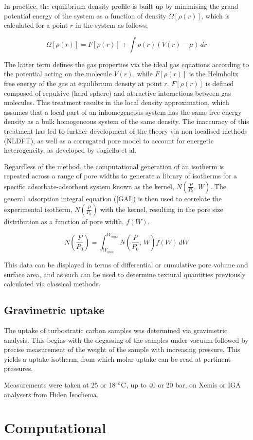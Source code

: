 In practice, the equilibrium density profile is built up by minimising the grand potential energy of the system as a function of density $\Omega[\rho(r)]$, which is calculated for a point $r$ in the system as follows;

\begin{equation}
\Omega[\rho(r)] = F[\rho(r)] + \int \rho(r)\left(V(r) - \mu\right) \,dr
\end{equation}

The latter term defines the gas properties via the ideal gas equations according to the potential acting on the molecule $V(r)$, while $F[\rho(r)]$ is the Helmholtz free energy of the gas at equilibrium density at point $r$. $F[\rho(r)]$ is defined composed of repulsive (hard sphere) and attractive interactions between gas molecules. This treatment results in the local density approximation, which assumes that a local part of an inhomegeneous system has the same free energy density as a bulk homogeneous system of the same density. The inaccuracy of this treatment has led to further development of the theory via non-localised methods (NLDFT),  \citep{tarazona1987phase, lastoskie1993pore, landers2013density} 
as well as a corrugated pore model to account for energetic heterogeneity, as developed by Jagiello et al.\citep{Jagiello20132D}

Regardless of the method, the computational generation of an isotherm is repeated across a range of pore widths to generate a library of isotherms for a specific adsorbate-adsorbent system known as the kernel, $N\left(\frac{P}{P_0}, \, W\right)$. The general adsorption integral equation (\ref{GAI}) is then used to correlate the experimental isotherm, $N\left(\frac{P}{P_0}\right)$  with the kernel, resulting in the pore size distribution as a function of pore width, $f(W)$.\citep{Thommes2015Physisorption}

\begin{equation} \label{eq:GAI}
    N\left(\frac{P}{P_0}\right) = \int_{W_{min}}^{W_{max}} N\left(\frac{P}{P_0}, \, W \right) f(W) \, dW
\end{equation}

This data can be displayed in terms of differential or cumulative pore volume and surface area, and as such can be used to determine textural quantities previously calculated via classical methods.

\subsection{\texorpdfstring{Gravimetric  uptake}{Gravimetric CO2 uptake}}
The  uptake of turbostratic carbon samples was determined via gravimetric analysis. This begins with the degassing of the samples under vacuum followed by precise measurement of the weight of the sample with increasing  pressure. This yields a  uptake isotherm, from which molar uptake can be read at pertinent pressures.

Measurements were taken at 25 or 18 $\rm ^{\circ}C$, up to 40 or 20 bar, on Xemis or IGA analysers from Hiden Isochema. 

\section{Computational}



